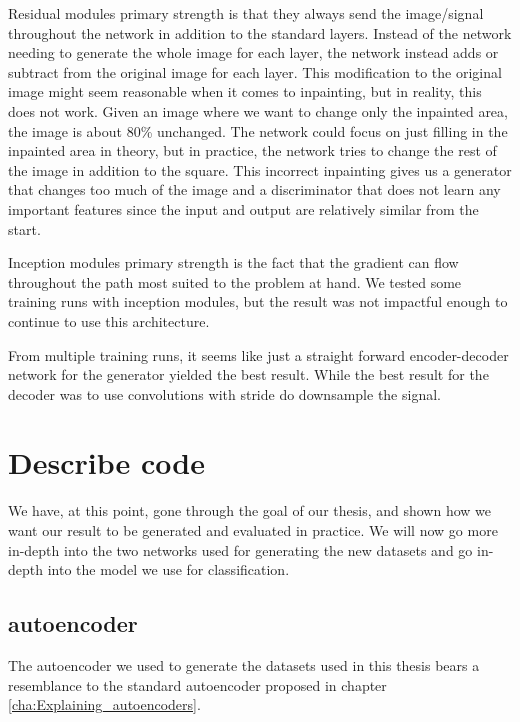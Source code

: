 Residual modules primary strength is that they always send the image/signal throughout the network in addition to the standard layers. Instead of the network needing to generate the whole image for each layer, the network instead adds or subtract from the original image for each layer.
This modification to the original image might seem reasonable when it comes to inpainting, but in reality, this does not work.  Given an image where we want to change only the inpainted area, the image is about 80\% unchanged. The network could focus on just filling in the inpainted area in theory, but in practice, the network tries to change the rest of the image in addition to the square. This incorrect inpainting gives us a generator that changes too much of the image and a discriminator that does not learn any important features since the input and output are relatively similar from the start.

Inception modules primary strength is the fact that the gradient can flow throughout the path most suited to the problem at hand.
We tested some training runs with inception modules, but the result was not impactful enough to continue to use this architecture.

From multiple training runs, it seems like just a straight forward encoder-decoder network for the generator yielded the best result. While the best result for the decoder was to use convolutions with stride do downsample the signal.




 
\section{Describe code}
We have, at this point, gone through the goal of our thesis, and shown how we want our result to be generated and evaluated in practice. 
We will now go more in-depth into the two networks used for generating the new datasets and go in-depth into the model we use for classification.


\subsection{autoencoder}
The autoencoder we used to generate the datasets used in this thesis bears a resemblance to the standard autoencoder proposed in chapter \ref{cha:Explaining_autoencoders}.

